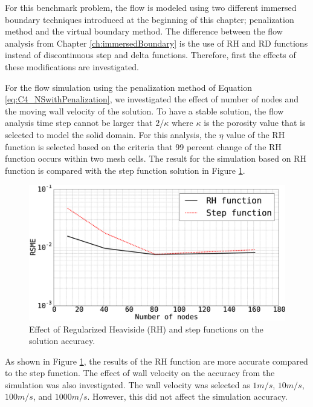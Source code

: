 For this benchmark problem, the flow is modeled using two different immersed boundary techniques introduced at the beginning of this chapter; penalization method and the virtual boundary method. The difference between the flow analysis from Chapter \ref{ch:immersedBoundary} is the use of RH and RD functions instead of discontinuous step and delta functions. Therefore, first the effects of these modifications are investigated.

For the flow simulation using the penalization method of Equation \eqref{eq:C4_NSwithPenalization}, we investigated the effect of number of nodes and the moving wall velocity of the solution. To have a stable solution, the flow analysis time step cannot be larger that $2 / \kappa$ where $\kappa$ is the porosity value that is selected to model the solid domain. For this analysis, the $\eta$ value of the RH function is selected based on the criteria that 99 percent change of the RH function occurs within two mesh cells. The result for the simulation based on RH function is compared with the step function solution in Figure \ref{fig:C4_effectOfRHfunctionOnSimulationResults1Dproblem}.

\begin{figure}[H]
    \centering
    \includegraphics[width=12.00cm]{Chapter_4/figure/effect_of_RH_on_simulation_vs_numberOfNodes_1D_problem.eps}
    \caption{Effect of Regularized Heaviside (RH) and step functions on the solution accuracy.}
    \label{fig:C4_effectOfRHfunctionOnSimulationResults1Dproblem}
\end{figure}

As shown in Figure \ref{fig:C4_effectOfRHfunctionOnSimulationResults1Dproblem}, the results of the RH function are more accurate compared to the step function. The effect of wall velocity on the accuracy from the simulation was also investigated. The wall velocity was selected as $1 m/s$, $10 m/s$, $100 m/s$, and $1000 m/s$. However, this did not affect the simulation accuracy.

